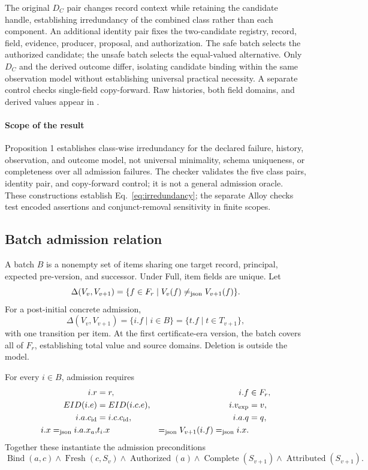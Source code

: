 The original $D_C$ pair changes record context while retaining the candidate handle, establishing irredundancy of the combined class rather than each component. An additional identity pair fixes the two-candidate registry, record, field, evidence, producer, proposal, and authorization. The safe batch selects the authorized candidate; the unsafe batch selects the equal-valued alternative. Only $D_C$ and the derived outcome differ, isolating candidate binding within the same observation model without establishing universal practical necessity. A separate control checks single-field copy-forward. Raw histories, both field domains, and derived values appear in .

\paragraph{Scope of the result}
Proposition 1 establishes class-wise irredundancy for the declared failure, history, observation, and outcome model, not universal minimality, schema uniqueness, or completeness over all admission failures. The checker validates the five class pairs, identity pair, and copy-forward control; it is not a general admission oracle. These constructions establish Eq.~\eqref{eq:irredundancy}; the separate Alloy checks test encoded assertions and conjunct-removal sensitivity in finite scopes.

\subsection{Batch admission relation}

A batch $B$ is a nonempty set of items sharing one target record, principal, expected pre-version, and successor. Under Full, item fields are unique. Let
\begin{equation}
\Delta(V_v,V_{v+1})=\{f\in F_r\mid V_v(f)\mathrel{\neq_{\mathrm{json}}} V_{v+1}(f)\}.
\end{equation}
For a post-initial concrete admission,
\begin{equation}
\Delta(V_v,V_{v+1})=\{i.f\mid i\in B\}=\{t.f\mid t\in T_{v+1}\},
\label{eq:changed-fields}
\end{equation}
with one transition per item. At the first certificate-era version, the batch covers all of $F_r$, establishing total value and source domains. Deletion is outside the model.

For every $i\in B$, admission requires
\begin{align}
i.r &= r, & i.f&\in F_r,\nonumber\\
EID(i.e) &= EID(i.c.e), & i.v_{\mathrm{exp}}&=v,\nonumber\\
i.a.c_{\mathrm{id}}&=i.c.c_{\mathrm{id}}, & i.a.q&=q,\nonumber\\
i.x\mathrel{=_{\mathrm{json}}} i.a.x_a, & t_i.x&\mathrel{=_{\mathrm{json}}} V_{v+1}(i.f)\mathrel{=_{\mathrm{json}}} i.x.
\label{eq:item-bindings}
\end{align}
Together these instantiate the admission preconditions
\begin{equation}
\operatorname{Bind}(a,c)\land\operatorname{Fresh}(c,S_v)\land
\operatorname{Authorized}(a)\land\operatorname{Complete}(S_{v+1})\land
\operatorname{Attributed}(S_{v+1}).
\end{equation}

